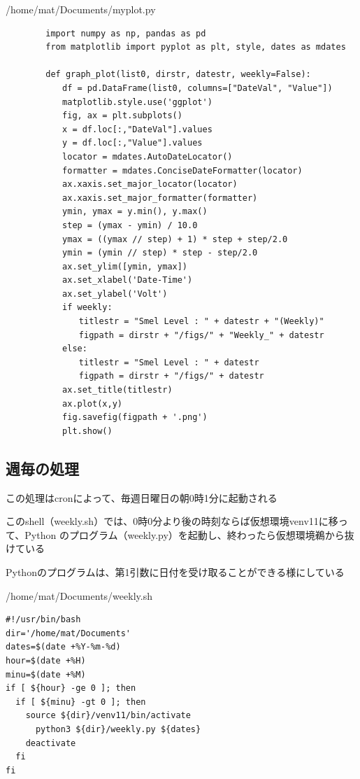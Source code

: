 \documentclass[12pt,a4paper,uplatex]{jsarticle}
\begin{document}
\begin{itembox}[l]{/home/mat/Documents/myplot.py}
	\begin{verbatim}
		import numpy as np, pandas as pd
		from matplotlib import pyplot as plt, style, dates as mdates
		
		def graph_plot(list0, dirstr, datestr, weekly=False):
		　　df = pd.DataFrame(list0, columns=["DateVal", "Value"])
		　　matplotlib.style.use('ggplot')
		　　fig, ax = plt.subplots()
		　　x = df.loc[:,"DateVal"].values
		　　y = df.loc[:,"Value"].values
		　　locator = mdates.AutoDateLocator()
		　　formatter = mdates.ConciseDateFormatter(locator)
		　　ax.xaxis.set_major_locator(locator)
		　　ax.xaxis.set_major_formatter(formatter)
		　　ymin, ymax = y.min(), y.max()
		　　step = (ymax - ymin) / 10.0
		　　ymax = ((ymax // step) + 1) * step + step/2.0
		　　ymin = (ymin // step) * step - step/2.0
		　　ax.set_ylim([ymin, ymax])
		　　ax.set_xlabel('Date-Time')
		　　ax.set_ylabel('Volt')
		　　if weekly:
		　　　　titlestr = "Smel Level : " + datestr + "(Weekly)"
		　　　　figpath = dirstr + "/figs/" + "Weekly_" + datestr
		　　else:
		　　　　titlestr = "Smel Level : " + datestr
		　　　　figpath = dirstr + "/figs/" + datestr
		　　ax.set_title(titlestr)
		　　ax.plot(x,y)
		　　fig.savefig(figpath + '.png')
		　　plt.show()	
	\end{verbatim}
\end{itembox}

\newpage

\subsection{週毎の処理}

この処理はcronによって、毎週日曜日の朝0時1分に起動される

このshell（weekly.sh）では、0時0分より後の時刻ならば仮想環境venv11に移って、Python のプログラム（weekly.py）を起動し、終わったら仮想環境鵜から抜けている

Pythonのプログラムは、第1引数に日付を受け取ることができる様にしている

\begin{itembox}[l]{/home/mat/Documents/weekly.sh}
	\begin{verbatim}
#!/usr/bin/bash
dir='/home/mat/Documents'
dates=$(date +%Y-%m-%d)
hour=$(date +%H)
minu=$(date +%M)
if [ ${hour} -ge 0 ]; then
  if [ ${minu} -gt 0 ]; then
    source ${dir}/venv11/bin/activate
      python3 ${dir}/weekly.py ${dates}
    deactivate
  fi
fi
	\end{verbatim}
\end{itembox}
\end{document}
